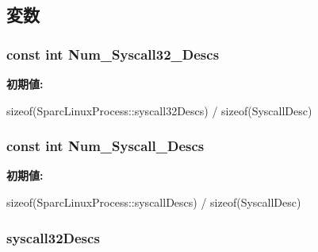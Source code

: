 \subsection{変数}
\hypertarget{classSparcISA_1_1SparcLinuxProcess_a0a786b34a677f6bb8f067ec80cfdb873}{
\subsubsection[{Num\_\-Syscall32\_\-Descs}]{\setlength{\rightskip}{0pt plus 5cm}const int {\bf Num\_\-Syscall32\_\-Descs}}}
\label{classSparcISA_1_1SparcLinuxProcess_a0a786b34a677f6bb8f067ec80cfdb873}
{\bfseries 初期値:}
\begin{DoxyCode}

    sizeof(SparcLinuxProcess::syscall32Descs) / sizeof(SyscallDesc)
\end{DoxyCode}
\hypertarget{classSparcISA_1_1SparcLinuxProcess_a9534988905c6f5c8c57c4b6a7b179fea}{
\subsubsection[{Num\_\-Syscall\_\-Descs}]{\setlength{\rightskip}{0pt plus 5cm}const int {\bf Num\_\-Syscall\_\-Descs}}}
\label{classSparcISA_1_1SparcLinuxProcess_a9534988905c6f5c8c57c4b6a7b179fea}
{\bfseries 初期値:}
\begin{DoxyCode}

    sizeof(SparcLinuxProcess::syscallDescs) / sizeof(SyscallDesc)
\end{DoxyCode}
\hypertarget{classSparcISA_1_1SparcLinuxProcess_a4b8a4b07a602fcc993b7f31369190958}{
\subsubsection[{syscall32Descs}]{ {\bf syscall32Descs}}}
